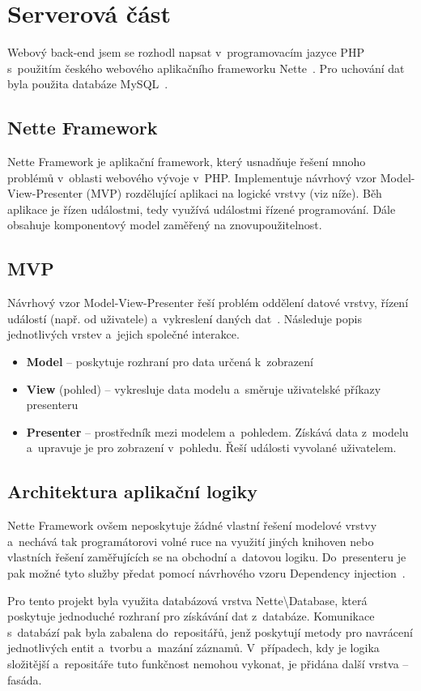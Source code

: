 \documentclass[11pt,twoside,a4paper]{book}
\newcommand*{\nomExpl}[2]{#2 (#1)\nomenclature{#1}{#2}} 	%
\begin{document}
\section{Serverová část}
Webový back-end jsem se rozhodl napsat v~programovacím jazyce PHP s~použitím českého webového aplikačního frameworku Nette~\cite{nette}. Pro uchování dat byla použita databáze MySQL~\cite{mysql}.

\subsection{Nette Framework}
Nette Framework je aplikační framework, který usnadňuje řešení mnoho problémů v~oblasti webového vývoje v~PHP. Imple\-mentuje návrhový vzor \nomExpl{MVP}{Model-View-Presenter} rozdělující aplikaci na logické vrstvy (viz níže). Běh aplikace je řízen událostmi, tedy využívá událostmi řízené programování. Dále obsahuje komponentový model zaměřený na znovupoužitelnost.

\subsection{MVP}
Návrhový vzor Model-View-Presenter řeší problém oddělení datové vrstvy, řízení událostí (např. od uživatele) a~vykreslení daných dat~\cite{mvp}. Následuje popis jednotlivých vrstev a~jejich společné interakce.

\begin{itemize}
	\item \textbf{Model} – poskytuje rozhraní pro data určená k~zobrazení
	\item \textbf{View} (pohled) – vykresluje data modelu a~směruje uživatelské příkazy presenteru
	\item \textbf{Presenter} – prostředník mezi modelem a~pohledem. Získává data z~modelu a~upravuje je pro zobrazení v~pohledu. Řeší události vyvolané uživatelem.
\end{itemize}

\subsection{Architektura aplikační logiky}
Nette Framework ovšem neposkytuje žádné vlastní řešení modelové vrstvy a~nechává tak programátorovi volné ruce na využití jiných knihoven nebo vlastních řešení zaměřujících se na obchodní a~datovou logiku. Do~presenteru je pak možné tyto služby předat pomocí návrhového vzoru Dependency injection~\cite{di}.

Pro tento projekt byla využita databázová vrstva Nette\textbackslash{}Database, která poskytuje jednoduché rozhraní pro získávání dat z~databáze. Komunikace s~databází pak byla zabalena do~repositářů, jenž poskytují metody pro navrácení jednotlivých entit a~tvorbu a~mazání záznamů. V~případech, kdy je logika složitější a~repositáře tuto funkčnost nemohou vykonat, je přidána další vrstva – fasáda. 
\end{document}
